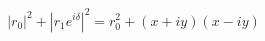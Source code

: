 \documentclass[preview]{standalone}
\begin{document}
\begin{align*}
|r_0|^2 + |r_1 e^{i\delta}|^2 = r_0^2 + (x+iy)(x-iy)
\end{align*}
\end{document}
